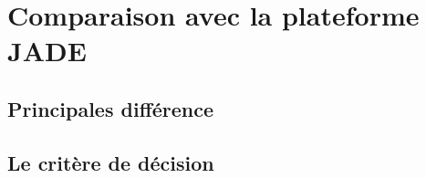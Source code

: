 \chapter{Comparaison avec la plateforme JADE}
\section{Principales différence}
\section{Le critère de décision}